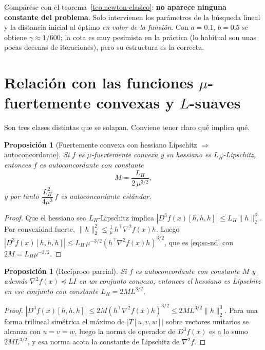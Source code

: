 \documentclass[11pt,a4paper,oneside]{book}
\newtheorem{proposicion}[teorema]{Proposición}
\theoremstyle{definition}
\theoremstyle{remark}
\newcommand{\T}{^{\top}}
\newcommand{\nrm}[1]{\lVert #1\rVert}
\newcommand{\abs}[1]{\left\lvert #1\right\rvert}
\newcommand{\LH}{L_{H}}
\begin{document}
Compárese con el teorema~\ref{teo:newton-clasico}: \textbf{no aparece ninguna constante del problema}. Solo
intervienen los parámetros de la búsqueda lineal y la distancia inicial al óptimo \emph{en valor de la función}.
Con $a=0.1$, $b=0.5$ se obtiene $\gamma\approx1/600$; la cota es muy pesimista en la práctica (lo habitual son
unas pocas decenas de iteraciones), pero su estructura es la correcta.

\section{Relación con las funciones \texorpdfstring{$\mu$}{mu}-fuertemente convexas y \texorpdfstring{$L$}{L}-suaves}\label{sec:sc-vs-muL}

Son tres clases distintas que se solapan. Conviene tener claro qué implica qué.

\begin{proposicion}[Fuertemente convexa con hessiano Lipschitz $\Rightarrow$ autoconcordante]\label{prop:muL-sc}
Si $f$ es $\mu$-fuertemente convexa y su hessiano es $\LH$-Lipschitz, entonces $f$ es autoconcordante con constante
\[ M=\frac{\LH}{2\,\mu^{3/2}}, \]
y por tanto $\dfrac{\LH^2}{4\mu^3}\,f$ es autoconcordante estándar.
\end{proposicion}

\begin{proof}
Que el hessiano sea $\LH$-Lipschitz implica $\abs{D^3f(x)[h,h,h]}\le\LH\nrm{h}_2^3$. Por convexidad fuerte,
$\nrm{h}_2^2\le\tfrac1\mu\,h\T\nabla^2 f(x)h$. Luego
$\abs{D^3f(x)[h,h,h]}\le\LH\,\mu^{-3/2}(h\T\nabla^2 f(x)h)^{3/2}$, que es \eqref{eq:sc-nd} con $2M=\LH\mu^{-3/2}$.
\end{proof}

\begin{proposicion}[Recíproco parcial]\label{prop:sc-muL}
Si $f$ es autoconcordante con constante $M$ y además $\nabla^2 f(x)\preceq LI$ en un conjunto convexo, entonces
el hessiano es Lipschitz en ese conjunto con constante $\LH=2ML^{3/2}$.
\end{proposicion}

\begin{proof}
$\abs{D^3f(x)[h,h,h]}\le2M(h\T\nabla^2 f(x)h)^{3/2}\le2ML^{3/2}\nrm{h}_2^3$. Para una forma trilineal simétrica el
máximo de $\abs{T[u,v,w]}$ sobre vectores unitarios se alcanza con $u=v=w$, luego la norma de operador de
$D^3f(x)$ es a lo sumo $2ML^{3/2}$, y esa norma acota la constante de Lipschitz de $\nabla^2 f$.
\end{proof}
\end{document}
